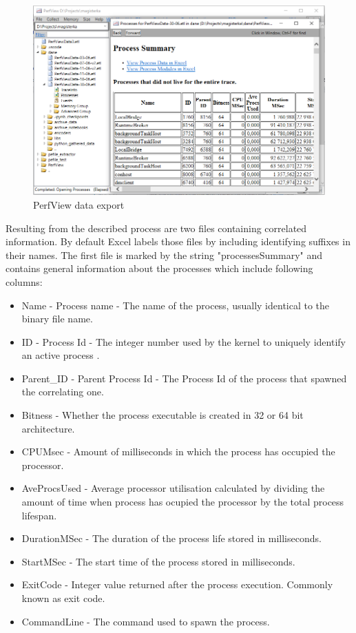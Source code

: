 \documentclass[a4paper,twoside,12pt]{book}
\begin{document}
\begin{figure}
	\centering
	\includegraphics[scale=0.55]{images/perf_export}
	\caption{PerfView data export}
	\label{fig:PerfViewexport}
 \end{figure}

Resulting from the described process are two files containing correlated information. By 
default Excel labels those files by including identifying suffixes in their names. The 
first file is marked by the string "processesSummary" and contains general information 
about the processes which include following columns:
\begin{itemize}
	\item Name - Process name - The name of the process, usually identical to the binary 
	file name.
	\item ID - Process Id - The integer number used by the kernel to uniquely identify 
	an active process \cite{bib:MicrosoftWinInternals}.
	\item Parent\_ID - Parent Process Id - The Process Id of the process that spawned the 
	correlating one.
	\item Bitness - Whether the process executable is created in 32 or 64 bit architecture.
	\item CPUMsec - Amount of milliseconds in which the process has occupied the processor. 
	\item AveProcsUsed - Average processor utilisation calculated by dividing the amount
	of time when process has ocupied the processor by the total process lifespan. 
	\item DurationMSec - The duration of the process life stored in milliseconds.
	\item StartMSec - The start time of the process stored in milliseconds.
	\item ExitCode - Integer value returned after the process execution. Commonly known as 
	exit code.
	\item CommandLine - The command used to spawn the process.
\end{itemize}
\end{document}
